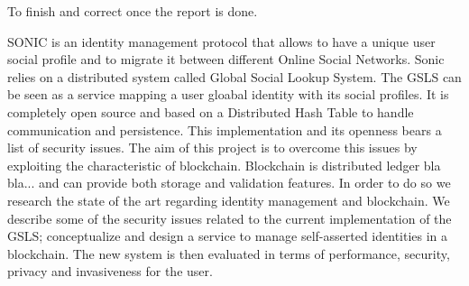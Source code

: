 
\begin{notation}
    To finish and correct once the report is done. 
\end{notation}
SONIC is an identity management protocol that allows to have a unique user social profile and to migrate it between different Online Social Networks. Sonic relies on a distributed system called Global Social Lookup System. The GSLS can be seen as a service mapping a user gloabal identity with its social profiles. It is completely open source and based on a Distributed Hash Table to handle communication and persistence. This implementation and its openness bears a list of security issues. The aim of this project is to overcome this issues by exploiting the characteristic of blockchain. Blockchain is distributed ledger bla bla... and can provide both storage and validation features. In order to do so we research the state of the art regarding identity management and blockchain. We describe some of the security issues related to the current implementation of the GSLS; conceptualize and design a service to manage self-asserted identities in a blockchain. The new system is then evaluated in terms of performance, security, privacy and invasiveness for the user. 




